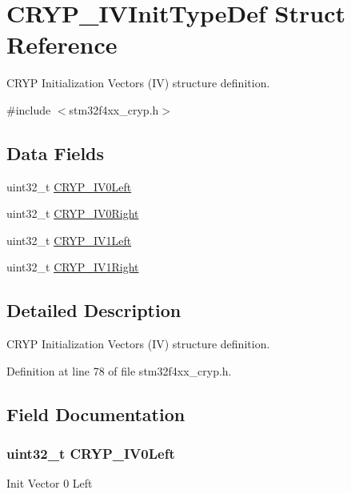 \hypertarget{struct_c_r_y_p___i_v_init_type_def}{\section{C\-R\-Y\-P\-\_\-\-I\-V\-Init\-Type\-Def Struct Reference}
\label{struct_c_r_y_p___i_v_init_type_def}
}


C\-R\-Y\-P Initialization Vectors (I\-V) structure definition.  




{\ttfamily \#include $<$stm32f4xx\-\_\-cryp.\-h$>$}

\subsection*{Data Fields}
\begin{DoxyCompactItemize}
\item 
uint32\-\_\-t \hyperlink{struct_c_r_y_p___i_v_init_type_def_a046a2af08ebf902cb03306771889c91f}{C\-R\-Y\-P\-\_\-\-I\-V0\-Left}
\item 
uint32\-\_\-t \hyperlink{struct_c_r_y_p___i_v_init_type_def_a161f9d7a7f2b4ab0d0d02f5b3e03b82d}{C\-R\-Y\-P\-\_\-\-I\-V0\-Right}
\item 
uint32\-\_\-t \hyperlink{struct_c_r_y_p___i_v_init_type_def_a5a43719bf281a2f12ac49f9b61852088}{C\-R\-Y\-P\-\_\-\-I\-V1\-Left}
\item 
uint32\-\_\-t \hyperlink{struct_c_r_y_p___i_v_init_type_def_a9f796973f4e0b2e146fcef98965dc71b}{C\-R\-Y\-P\-\_\-\-I\-V1\-Right}
\end{DoxyCompactItemize}


\subsection{Detailed Description}
C\-R\-Y\-P Initialization Vectors (I\-V) structure definition. 

Definition at line 78 of file stm32f4xx\-\_\-cryp.\-h.



\subsection{Field Documentation}
\hypertarget{struct_c_r_y_p___i_v_init_type_def_a046a2af08ebf902cb03306771889c91f}{
\subsubsection[{C\-R\-Y\-P\-\_\-\-I\-V0\-Left}]{\setlength{\rightskip}{0pt plus 5cm}uint32\-\_\-t C\-R\-Y\-P\-\_\-\-I\-V0\-Left}}\label{struct_c_r_y_p___i_v_init_type_def_a046a2af08ebf902cb03306771889c91f}
Init Vector 0 Left 

